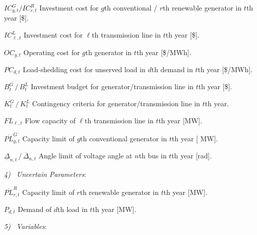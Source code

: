 \documentclass[journal]{IEEEtran}
\begin{document}
\begin{IEEEdescription}
\item[$IC_{g,t}^G/IC_{r,t}^R$] Investment cost for $g$th conventional / $r$th renewable generator in $t$th year [\$].
\item[$IC_{\ell,t}^L$] Investment cost for $\ell$th transmission line in $t$th year [\$].
\item[$OC_{g,t}$] Operating cost for $g$th generator in $t$th year [\$/MWh].
\item[$PC_{d,t}$] Load-shedding cost for unserved load in $d$th demand in $t$th year [\$/MWh].
\item[$B_t^G \, / \, B_t^L$] Investment budget for generator/transmission line in $t$th year [\$].
\item[$K_t^G \, / \, K_t^L$] Contingency criteria for generator/transmission line in $t$th year.
\item[$FL_{\ell,t}$] Flow capacity of $\ell$th transmission line in $t$th year [MW].
\item[$\overline{PL}^G_{g,t}$] Capacity limit of $g$th conventional generator in $t$th year [ MW].
\item[$\underline{\Delta}_{n,t} \, / \, \overline{\Delta}_{n,t}$] Angle limit of voltage angle at $n$th bus in $t$th year [rad].
\end{IEEEdescription}
\emph{4) \ Uncertain Parameters}:
\begin{IEEEdescription}
\item[$\overline{PL}^R_{r,t}$] Capacity limit of $r$th renewable generator in $t$th year  [MW].
\item[$P_{d,t}$] Demand of $d$th load in $t$th year [MW].
\end{IEEEdescription}
\emph{5) \ Variables}:
\end{document}
